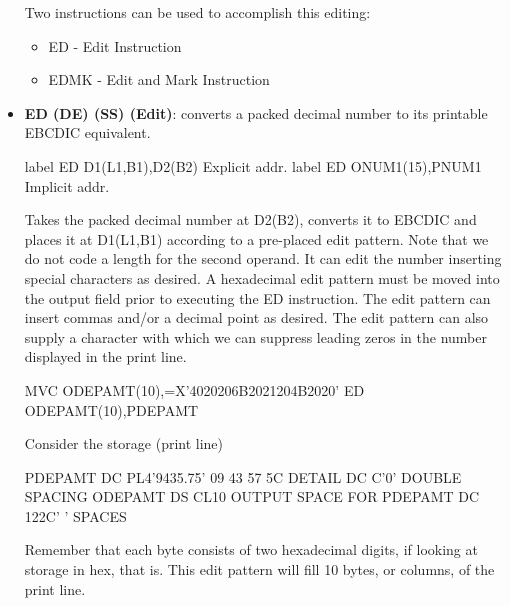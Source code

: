 \documentclass{report}
\begin{document}
\begin{itemize}
            \bigbreak \noindent 
            Two instructions can be used to accomplish this editing:
            \begin{itemize}
                \item ED - Edit Instruction
                \item EDMK - Edit and Mark Instruction
            \end{itemize}
        \item \textbf{ED (DE) (SS) (Edit)}: converts a packed decimal number to its printable EBCDIC equivalent.
            \bigbreak \noindent 
            \begin{cppcode}
                label ED D1(L1,B1),D2(B2) Explicit addr.
                label ED ONUM1(15),PNUM1 Implicit addr.
            \end{cppcode}
            \bigbreak \noindent 
            Takes the packed decimal number at D2(B2), converts it to EBCDIC and places it at D1(L1,B1) according to a pre-placed edit pattern.
            \bigbreak \noindent 
            Note that we do not code a length for the second operand.
            \bigbreak \noindent 
            It can edit the number inserting special characters as desired.
            \bigbreak \noindent 
            A hexadecimal edit pattern must be moved into the output field prior to executing the ED instruction.
            \bigbreak \noindent 
            The edit pattern can insert commas and/or a decimal point as desired.
            \bigbreak \noindent 
            The edit pattern can also supply a character with which we can suppress leading zeros in the number displayed in the print line.
            \bigbreak \noindent 
            \begin{cppcode}
                MVC ODEPAMT(10),=X'4020206B2021204B2020'
                ED ODEPAMT(10),PDEPAMT
            \end{cppcode}
            \bigbreak \noindent 
            Consider the storage (print line)
            \bigbreak \noindent 
            \begin{cppcode}
                PDEPAMT DC PL4'9435.75' 09 43 57 5C
                DETAIL DC C'0' DOUBLE SPACING
                ODEPAMT DS CL10 OUTPUT SPACE FOR PDEPAMT
                DC 122C' ' SPACES
            \end{cppcode}
            \bigbreak \noindent 
            Remember that each byte consists of two hexadecimal digits, if looking at storage in hex, that is.
            \bigbreak \noindent 
            This edit pattern will fill 10 bytes, or columns, of the print line. 

\end{itemize}
\end{document}
